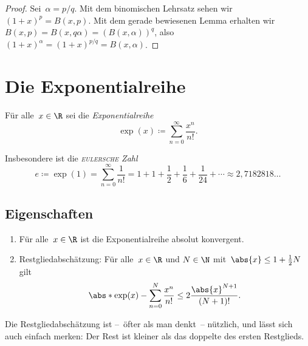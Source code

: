 \documentclass[a4paper]{article}
\begin{document}
\begin{proof}
    Sei~$\alpha = p/q$. Mit dem binomischen Lehrsatz sehen wir $(1+x)^p = B(x,p)$. Mit dem gerade bewiesenen Lemma erhalten wir $B(x,p) = B(x,q\alpha) = (B(x,\alpha))^q$, also $(1+x)^\alpha = (1+x)^{p/q} = B(x,\alpha)$.
\end{proof}

\section{Die Exponentialreihe}

\begin{definition}
    Für alle~$x \in \R$ sei die \emph{Exponentialreihe}
    \begin{equation*}
        \exp(x) \coloneqq \sum_{n=0}^\infty \frac{x^n}{n!}.
    \end{equation*}

    Insbesondere ist die \emph{\textsc{eulersche} Zahl}
    \begin{equation*}
        e \coloneqq \exp(1) = \sum_{n=0}^\infty \frac{1}{n!} = 1 + 1 + \frac{1}{2} + \frac{1}{6} + \frac{1}{24} + \cdots \approx 2,7182818\dots
    \end{equation*}
\end{definition}

\subsection{Eigenschaften}

\begin{theorem}\leavevmode
    \begin{enumerate}
        \item Für alle~$x \in \R$ ist die Exponentialreihe absolut konvergent.
        \item Restgliedabschätzung: Für alle~$x \in \R$ und $N \in \N$ mit~$\abs{x} \leq 1+\frac{1}{2}N$ gilt
              \begin{equation*}
                  \abs*{\exp(x) - \sum_{n=0}^N \frac{x^n}{n!}} \leq 2 \frac{\abs{x}^{N+1}}{(N+1)!}.
              \end{equation*}
    \end{enumerate}
\end{theorem}

Die Restgliedabschätzung ist --~öfter als man denkt~-- nützlich, und lässt sich auch einfach merken: Der Rest ist kleiner als das doppelte des ersten Restglieds.
\end{document}
